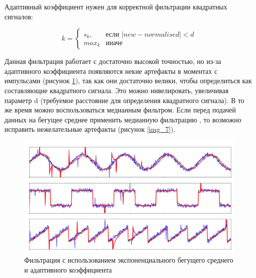 Адаптивный коэффициент нужен для корректной фильтрации квадратных сигналов:

\begin{equation}
	k = 
	\begin{cases}
		s_k, &\text{если $|new - normalised| < d$}\\
		max_k &\text{иначе}
	\end{cases}
\end{equation}

Данная фильтрация работает с достаточно высокой точностью, но из-за адаптивного коэффициента появляются некие артефакты в моментах с импульсами (рисунок \ref{img_6}), так как они достаточно велики, чтобы определиться как составляющие квадратного сигнала. Это можно нивелировать, увеличивая параметр d (требуемое расстояние для определения квадратного сигнала). В то же время можно воспользоваться медианным фильтром. Если перед подачей данных на бегущее среднее применить медианную фильтрацию \cite{glide3}, то возможно исправить нежелательные артефакты (рисунок \ref{img_7}).


\newpage

\begin{figure}[h]
	\begin{center}
		\includegraphics[pages=-, scale=0.33]{./inc/img/6.png}
		\caption{Фильтрация с использованием экспоненциального бегущего среднего и адаптивного коэффициента}  
		\label{img_6}
	\end{center}
\end{figure}

